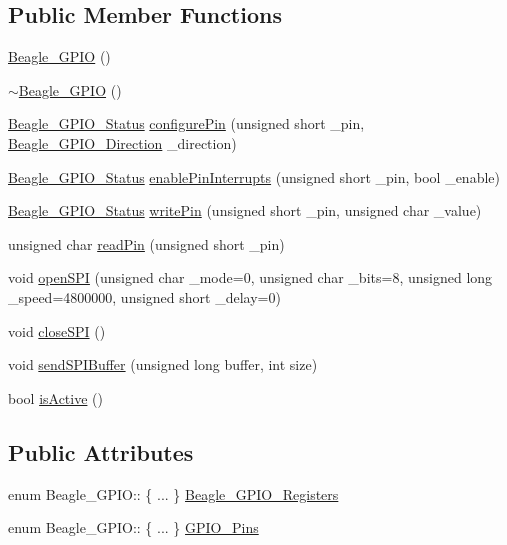 \subsection*{\-Public \-Member \-Functions}
\begin{DoxyCompactItemize}
\item 
\hyperlink{class_beagle___g_p_i_o_a9d59bb015cf2fd0643905cdf3f265efe}{\-Beagle\-\_\-\-G\-P\-I\-O} ()
\item 
\hyperlink{class_beagle___g_p_i_o_a602473a6b993564cd7adbb9c9d09695c}{$\sim$\-Beagle\-\_\-\-G\-P\-I\-O} ()
\item 
\hyperlink{class_beagle___g_p_i_o_a40ebd672d74de41bbf5944109e1302ee}{\-Beagle\-\_\-\-G\-P\-I\-O\-\_\-\-Status} \hyperlink{class_beagle___g_p_i_o_abdcefa3029c653b16bdf11075601b1fa}{configure\-Pin} (unsigned short \-\_\-pin, \hyperlink{class_beagle___g_p_i_o_abf8efba9f6a4f6b552d1c15c99100765}{\-Beagle\-\_\-\-G\-P\-I\-O\-\_\-\-Direction} \-\_\-direction)
\item 
\hyperlink{class_beagle___g_p_i_o_a40ebd672d74de41bbf5944109e1302ee}{\-Beagle\-\_\-\-G\-P\-I\-O\-\_\-\-Status} \hyperlink{class_beagle___g_p_i_o_a7b67e50e7cc1dfa3a5be88d6c4ed8229}{enable\-Pin\-Interrupts} (unsigned short \-\_\-pin, bool \-\_\-enable)
\item 
\hyperlink{class_beagle___g_p_i_o_a40ebd672d74de41bbf5944109e1302ee}{\-Beagle\-\_\-\-G\-P\-I\-O\-\_\-\-Status} \hyperlink{class_beagle___g_p_i_o_a33d763b486233269f5e8045b69d9ec49}{write\-Pin} (unsigned short \-\_\-pin, unsigned char \-\_\-value)
\item 
unsigned char \hyperlink{class_beagle___g_p_i_o_a698b1f9ef0e609f1b28d823a7d01a8d6}{read\-Pin} (unsigned short \-\_\-pin)
\item 
void \hyperlink{class_beagle___g_p_i_o_a661c40e472c9e7795cc92718ad4b2d30}{open\-S\-P\-I} (unsigned char \-\_\-mode=0, unsigned char \-\_\-bits=8, unsigned long \-\_\-speed=4800000, unsigned short \-\_\-delay=0)
\item 
void \hyperlink{class_beagle___g_p_i_o_a747aaea28330bc339002e43f0e04bb0c}{close\-S\-P\-I} ()
\item 
void \hyperlink{class_beagle___g_p_i_o_a74e936b8da8c28a39a44707317059a01}{send\-S\-P\-I\-Buffer} (unsigned long buffer, int size)
\item 
bool \hyperlink{class_beagle___g_p_i_o_a7a5bcd9a30ae1564f59c94a5c5887b32}{is\-Active} ()
\end{DoxyCompactItemize}
\subsection*{\-Public \-Attributes}
\begin{DoxyCompactItemize}
\item 
enum \-Beagle\-\_\-\-G\-P\-I\-O\-:: \{ ... \}  \hyperlink{class_beagle___g_p_i_o_a0164dbfd9376ef3a1e0a404d5cf2f431}{\-Beagle\-\_\-\-G\-P\-I\-O\-\_\-\-Registers}
\item 
enum \-Beagle\-\_\-\-G\-P\-I\-O\-:: \{ ... \}  \hyperlink{class_beagle___g_p_i_o_a0806cf8c44549ab348c5f82197e23d9e}{\-G\-P\-I\-O\-\_\-\-Pins}
\end{DoxyCompactItemize}
